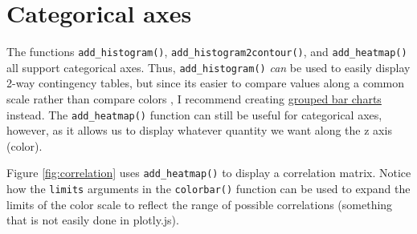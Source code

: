 \documentclass[
  12pt,
]{krantz}
\newenvironment{Shaded}{\begin{snugshade}}{\end{snugshade}}
\newcommand{\DataTypeTok}[1]{\textcolor[rgb]{0.13,0.29,0.53}{#1}}
\newcommand{\DecValTok}[1]{\textcolor[rgb]{0.00,0.00,0.81}{#1}}
\newcommand{\KeywordTok}[1]{\textcolor[rgb]{0.13,0.29,0.53}{\textbf{#1}}}
\newcommand{\NormalTok}[1]{#1}
\newcommand{\OperatorTok}[1]{\textcolor[rgb]{0.81,0.36,0.00}{\textbf{#1}}}
\newcommand{\StringTok}[1]{\textcolor[rgb]{0.31,0.60,0.02}{#1}}
\begin{document}
\hypertarget{categorical-axes}{%
\section{Categorical axes}\label{categorical-axes}}

The functions \texttt{add\_histogram()}, \texttt{add\_histogram2contour()}, and \texttt{add\_heatmap()} all support categorical axes. Thus, \texttt{add\_histogram()} \emph{can} be used to easily display 2-way contingency tables, but since its easier to compare values along a common scale rather than compare colors \citep{graphical-perception}, I recommend creating \protect\hyperlink{multiple-discrete-distributions}{grouped bar charts} instead. The \texttt{add\_heatmap()} function can still be useful for categorical axes, however, as it allows us to display whatever quantity we want along the z axis (color).

Figure \ref{fig:correlation} uses \texttt{add\_heatmap()} to display a correlation matrix. Notice how the \texttt{limits} arguments in the \texttt{colorbar()} function can be used to expand the limits of the color scale to reflect the range of possible correlations (something that is not easily done in plotly.js).

\begin{Shaded}
\end{Shaded}
\end{document}
